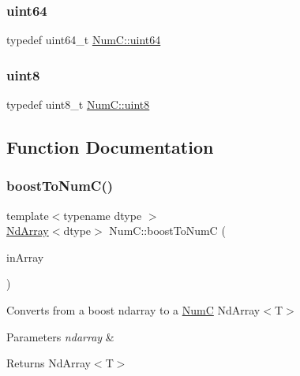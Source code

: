 \mbox{\label{namespace_num_c_a22306a0884a815781c5b147415f6d817}} 
\subsubsection{\texorpdfstring{uint64}{uint64}}
{\footnotesize\ttfamily typedef uint64\+\_\+t \mbox{\hyperlink{namespace_num_c_a22306a0884a815781c5b147415f6d817}{Num\+C\+::uint64}}}

\mbox{\label{namespace_num_c_a60b2e2f49e1ff61059731c154e560869}} 
\subsubsection{\texorpdfstring{uint8}{uint8}}
{\footnotesize\ttfamily typedef uint8\+\_\+t \mbox{\hyperlink{namespace_num_c_a60b2e2f49e1ff61059731c154e560869}{Num\+C\+::uint8}}}



\subsection{Function Documentation}
\mbox{\label{namespace_num_c_ae4b807d81054b18034f455e5ead76711}} 
\subsubsection{\texorpdfstring{boost\+To\+Num\+C()}{boostToNumC()}}
{\footnotesize\ttfamily template$<$typename dtype $>$ \\
\mbox{\hyperlink{class_num_c_1_1_nd_array}{Nd\+Array}}$<$dtype$>$ Num\+C\+::boost\+To\+NumC (\begin{DoxyParamCaption}\item[{boost\+::python\+::numpy\+::ndarray \&}]{in\+Array }\end{DoxyParamCaption})}

Converts from a boost ndarray to a \mbox{\hyperlink{namespace_num_c}{NumC}} Nd\+Array$<$\+T$>$


\begin{DoxyParams}{Parameters}
{\em ndarray} & \\
\hline
\end{DoxyParams}
\begin{DoxyReturn}{Returns}
Nd\+Array$<$\+T$>$ 
\end{DoxyReturn}
\mbox{\label{namespace_num_c_a40a56236fea76d55726c915c1415ab67}} 
